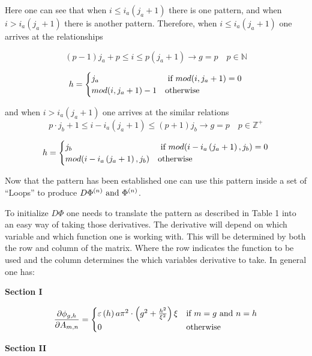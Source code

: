 Here one can see that when $i\le i_{a} \left(j_{a} +1\right)$ there is one
pattern, and when $i>i_{a} \left(j_{a} +1\right)$ there is another pattern.
Therefore, when $i\le i_{a} \left(j_{a} +1\right)$ one arrives at the
relationships 

\begin{equation*}
    \left(p - 1\right) j_{a} + p \le i \le p(j_{a} + 1) \to g = p 
    \quad p \in \mathbb{N} 
\end{equation*}

\begin{equation*}
    h = \begin{cases} j_{a} & \text{ if } mod(i,j_{a} + 1) = 0 \\ mod(i,j_{a} +1) - 1 & \text{otherwise} \end{cases} 
\end{equation*}

and when $i>i_{a} \left(j_{a} +1\right)$ one arrives at the similar relations
\begin{equation*}
    p \cdot j_{b} + 1 \le i - i_{a} \left(j_{a} + 1\right) \le \left(p + 1\right) j_{b} \to g = p
    \quad p \in \mathbb{Z}^{+}
\end{equation*}

\begin{equation*}
    h = \begin{cases} j_{b} & \text{ if } mod(i - i_{a} \left(j_{a} + 1\right), j_{b})=0 \\ mod(i - i_{a} \left(j_{a} + 1\right), j_{b}) & \text{otherwise} \end{cases}
\end{equation*}

Now that the pattern has been established one can use this pattern inside a set
of ``Loops'' to produce $D\Phi ^{\left(n\right)} \text{ and } \Phi ^{\left(n\right)}
$.

To initialize $D\Phi $ one needs to translate the pattern as described in Table
1 into an easy way of taking those derivatives. The derivative will depend on
which variable and which function one is working with. This will be determined
by both the row and column of the matrix. Where the row indicates the function
to be used and the column determines the which variables derivative to take. In
general one has:

\textbf{Section I}

\begin{equation} \label{4.10)} 
    \frac{\partial \phi_{g,h}}{\partial A_{m,n}} = \begin{cases} \varepsilon \left(h\right)a\pi ^{2} \cdot 
    \left(g^{2} +\frac{h^{2} }{\xi ^{2} } \right) \xi  &  \text{if } m = g \text{ and } n = h  \\ 0 & \text{otherwise} \end{cases}
\end{equation}

\textbf{Section II}

